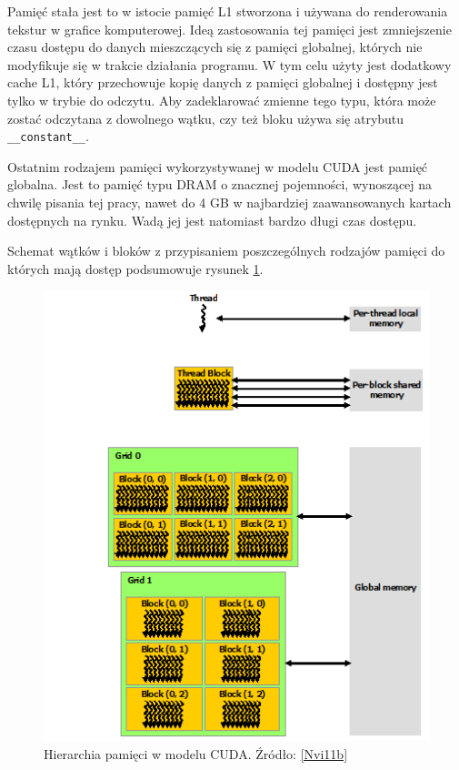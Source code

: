 Pamięć stała jest to w istocie pamięć L1 stworzona i używana do renderowania tekstur 
w grafice komputerowej. Ideą zastosowania tej pamięci jest zmniejszenie czasu
dostępu do danych mieszczących się z pamięci globalnej, których nie modyfikuje się w trakcie działania programu.
W tym celu użyty jest dodatkowy cache L1, który przechowuje kopię danych 
z pamięci globalnej i dostępny jest tylko w trybie do odczytu.
Aby zadeklarować zmienne tego typu, która może zostać odczytana z dowolnego
wątku, czy też bloku używa się atrybutu \texttt{\_\_constant\_\_}.

Ostatnim rodzajem pamięci wykorzystywanej w modelu CUDA jest pamięć globalna.
Jest to pamięć typu DRAM o znacznej pojemności, wynoszącej na chwilę pisania tej
pracy, nawet do 4 GB w najbardziej zaawansowanych kartach dostępnych na rynku. 
Wadą jej jest natomiast bardzo długi czas dostępu.

Schemat wątków i bloków z przypisaniem poszczególnych rodzajów pamięci do których
mają dostęp podsumowuje rysunek \ref{hier}.

\begin{figure}[H]
\centering
\includegraphics[scale=0.6]{images/memory-hierarchy.png}
\caption{Hierarchia pamięci w modelu CUDA. Źródło: \ref{Nvi11b}}
\label{hier}
\end{figure}

